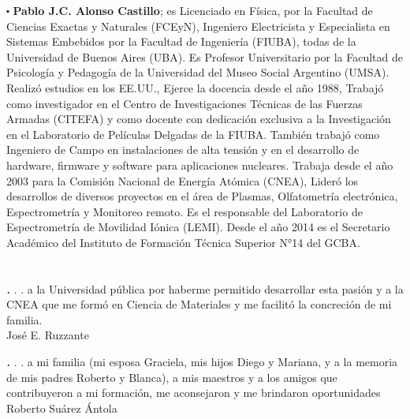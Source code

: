 \documentclass[
11pt, %
spanish,
singlespacing, %
parskip, %
headsepline, %
]{MastersDoctoralThesis} %
\begin{document}
\begin{sloppypar}
$\centerdot$ \textbf{Pablo J.C. Alonso Castillo}; es Licenciado en Física, por la Facultad de Ciencias Exactas y Naturales (FCEyN), Ingeniero Electricista y Especialista en Sistemas Embebidos por la Facultad de Ingeniería (FIUBA), todas de la Universidad de Buenos Aires (UBA). Es Profesor Universitario  por la Facultad de Psicología y Pedagogía de la Universidad del Museo Social Argentino (UMSA). Realizó estudios en los EE.UU., Ejerce la docencia desde el año 1988, Trabajó como investigador en el Centro de Investigaciones Técnicas de las Fuerzas Armadas (CITEFA) y como docente con dedicación exclusiva a la Investigación en el Laboratorio de Películas Delgadas de la FIUBA. También  trabajó como Ingeniero de Campo en instalaciones de alta tensión y en el desarrollo de hardware, firmware y software para aplicaciones nucleares. Trabaja desde el año 2003 para la Comisión Nacional de Energía Atómica (CNEA), Lideró los desarrollos de diversos proyectos en el área de Plasmas, Olfatometría electrónica, Espectrometría y Monitoreo remoto. Es el responsable del Laboratorio de Espectrometría de Movilidad Iónica (LEMI). Desde el año 2014 es el Secretario Académico del Instituto de Formación Técnica Superior N°14 del GCBA.

\end{sloppypar}



\chapter*{ }%

\vspace{0.5cm} 
\begin{flushright}
{\Large \textbf \textit . . . a la Universidad pública por haberme permitido desarrollar esta pasión y a la CNEA que me formó en Ciencia de Materiales y me facilitó la concreción de mi familia.  \\
\vspace{5mm}
José E. Ruzzante}
\end{flushright}
\vspace{1.0cm} 

\begin{flushright}
{\Large \textbf \textit . . . a mi familia (mi esposa Graciela, mis hijos Diego y Mariana, y a la memoria de mis padres Roberto y Blanca), a mis maestros y a los amigos que contribuyeron a mi formación, me aconsejaron y me brindaron oportunidades \\
\vspace{5mm}
Roberto Suárez Ántola}
\end{flushright}
\vspace{1.0cm} 
\end{document}
